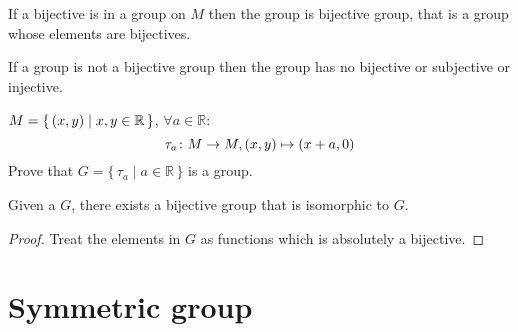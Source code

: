 \documentclass[../main.tex]{subfiles}
\begin{document}
If a bijective is in a group on \(M\) then the group is 
bijective group, that is a group whose elements are 
bijectives. 

If a group is not a bijective group then the group 
has no bijective or subjective or injective. 

\begin{exam}
	\(M = \{ \, (x,y) \mid x, y \in \mathbb{R} \, \}\), \(\forall a \in \mathbb{R}\):  
	\[
		\tau_{a} \colon M \to M , (x,y) \mapsto (x + a, 0)
	\]
	Prove that \(G = \{ \,\tau _{a} \mid a \in \mathbb{R} \, \}\) is a group. 
\end{exam}

\begin{thm}[Cayley]
\label{Cayley}
Given a \(G\), there exists a bijective group that is isomorphic to \(G\). 
\end{thm}
\begin{proof}
Treat the elements in \(G\) as functions which is absolutely a  
bijective.
\end{proof}

\section{Symmetric group}
\label{sec:Symmetric group}
\end{document}
